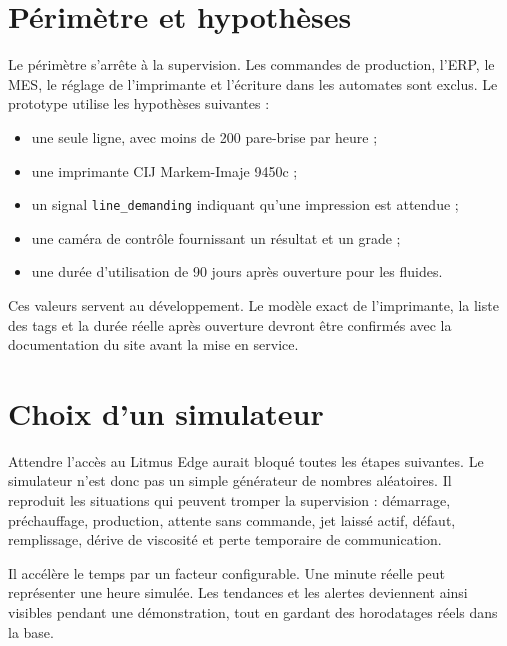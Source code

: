\section{Périmètre et hypothèses}

Le périmètre s'arrête à la supervision. Les commandes de production, l'ERP, le
MES, le réglage de l'imprimante et l'écriture dans les automates sont exclus.
Le prototype utilise les hypothèses suivantes :

\begin{itemize}
  \item une seule ligne, avec moins de 200 pare-brise par heure ;
  \item une imprimante CIJ Markem-Imaje 9450c ;
  \item un signal \texttt{line\_demanding} indiquant qu'une impression est
        attendue ;
  \item une caméra de contrôle fournissant un résultat et un grade ;
  \item une durée d'utilisation de 90 jours après ouverture pour les fluides.
\end{itemize}

\begin{warningbox}
Ces valeurs servent au développement. Le modèle exact de l'imprimante, la
liste des tags et la durée réelle après ouverture devront être confirmés avec
la documentation du site avant la mise en service.
\end{warningbox}

\section{Choix d'un simulateur}

Attendre l'accès au Litmus Edge aurait bloqué toutes les étapes suivantes. Le
simulateur n'est donc pas un simple générateur de nombres aléatoires. Il
reproduit les situations qui peuvent tromper la supervision : démarrage,
préchauffage, production, attente sans commande, jet laissé actif, défaut,
remplissage, dérive de viscosité et perte temporaire de communication.

Il accélère le temps par un facteur configurable. Une minute réelle peut
représenter une heure simulée. Les tendances et les alertes deviennent ainsi
visibles pendant une démonstration, tout en gardant des horodatages réels dans
la base.
